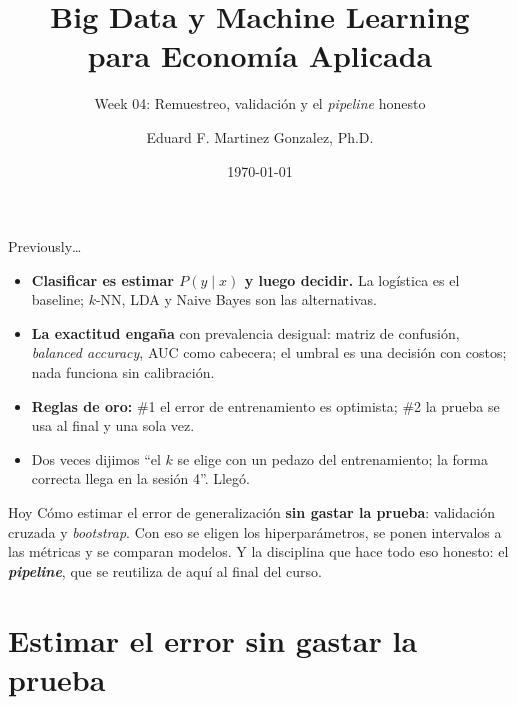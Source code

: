 \documentclass{beamer}
\title[BDML]{Big Data y Machine Learning \\ para Economía Aplicada}
\subtitle{Week 04: Remuestreo, validación y el \emph{pipeline} honesto}
\author{Eduard F. Martinez Gonzalez, Ph.D.}
\institute[]{Departamento de Economía, Universidad Icesi}
\date{\today}
\newcommand{\1}{\mathbb{I}}
\begin{document}
\begin{frame}
\titlepage
\end{frame}

\begin{frame}{Previously\ldots}
\small
\begin{itemize}\itemsep5pt
  \item \textbf{Clasificar es estimar $P(y \mid x)$ y luego decidir.} La logística es el baseline; $k$-NN, LDA y Naive Bayes son las alternativas. \pause
  \item \textbf{La exactitud engaña} con prevalencia desigual: matriz de confusión, \emph{balanced accuracy}, AUC como cabecera; el umbral es una decisión con costos; nada funciona sin calibración. \pause
  \item \textbf{Reglas de oro:} \#1 el error de entrenamiento es optimista; \#2 la prueba se usa al final y una sola vez. \pause
  \item Dos veces dijimos ``el $k$ se elige con un pedazo del entrenamiento; la forma correcta llega en la sesión 4''. Llegó.
\end{itemize}
\pause
\vspace{0.1cm}
\begin{block}{Hoy}
Cómo estimar el error de generalización \textbf{sin gastar la prueba}: validación cruzada y \emph{bootstrap}. Con eso se eligen los hiperparámetros, se ponen intervalos a las métricas y se comparan modelos. Y la disciplina que hace todo eso honesto: el \textbf{\emph{pipeline}}, que se reutiliza de aquí al final del curso.
\end{block}
\end{frame}


\section{Estimar el error sin gastar la prueba}
\begin{frame}[noframenumbering]
\tableofcontents[currentsection]
\end{frame}
\end{document}
